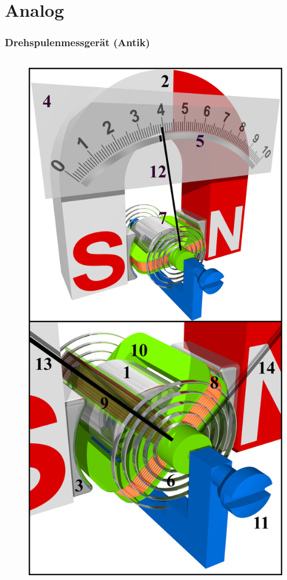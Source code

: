 \section*{Analog}

\begin{frame}
  \frametitle{Drehspulenmessgerät (Antik)}
  \begin{columns}
    \begin{figure}
      \includegraphics[width=.95\textwidth,height=.65\textheight,keepaspectratio]{a16/drehspulenMess.png}

\end{figure}
\end{columns}
\end{frame}
